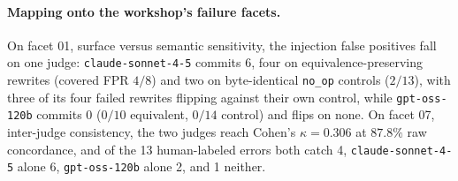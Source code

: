 %
%
%
%
%

\paragraph{Mapping onto the workshop's failure facets.}
On facet 01, surface versus semantic sensitivity, the injection false positives
fall on one judge: \texttt{claude-sonnet-4-5} commits $6$, four on
equivalence-preserving rewrites (covered FPR $4/8$) and two on byte-identical
\texttt{no\_op} controls ($2/13$), with three of its four failed rewrites
flipping against their own control, while \texttt{gpt-oss-120b} commits $0$
($0/10$ equivalent, $0/14$ control) and flips on none. On facet 07, inter-judge
consistency, the two judges reach Cohen's $\kappa = 0.306$ at $87.8\%$ raw
concordance, and of the 13 human-labeled errors both catch 4,
\texttt{claude-sonnet-4-5} alone 6, \texttt{gpt-oss-120b} alone 2, and 1
neither.
